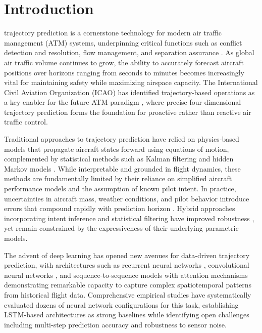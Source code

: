 \documentclass[letterpaper,journal]{IEEEtran}
\begin{document}
\section{Introduction}
 trajectory prediction is a cornerstone technology for
modern air traffic management (ATM) systems, underpinning critical functions such
as conflict detection and resolution, flow management, and separation assurance
\cite{ICAO2025,Schuster2024}. As global air traffic volume continues to grow,
the ability to accurately forecast aircraft positions over horizons ranging from
seconds to minutes becomes increasingly vital for maintaining safety while maximizing
airspace capacity. The International Civil Aviation Organization (ICAO) has identified
trajectory-based operations as a key enabler for the future ATM paradigm \cite{ICAO2025},
where precise four-dimensional trajectory prediction forms the foundation for proactive
rather than reactive air traffic control.

Traditional approaches to trajectory prediction have relied on physics-based models
that propagate aircraft states forward using equations of motion, complemented by
statistical methods such as Kalman filtering and hidden Markov models \cite{Lymperopoulos2010,
Alligier2015}. While interpretable and grounded in flight dynamics, these methods are
fundamentally limited by their reliance on simplified aircraft performance models and
the assumption of known pilot intent. In practice, uncertainties in aircraft mass,
weather conditions, and pilot behavior introduce errors that compound rapidly with
prediction horizon \cite{Zhang2021}. Hybrid approaches incorporating intent inference
and statistical filtering have improved robustness \cite{Liu2016}, yet remain constrained
by the expressiveness of their underlying parametric models.

The advent of deep learning has opened new avenues for data-driven trajectory prediction,
with architectures such as recurrent neural networks \cite{Pang2020}, convolutional neural
networks \cite{Chen2022TITS}, and sequence-to-sequence models with attention mechanisms
\cite{Zhang2020,Georgiou2022} demonstrating remarkable capacity to capture complex
spatiotemporal patterns from historical flight data. Comprehensive empirical studies
\cite{Ayala2023} have systematically evaluated dozens of neural network configurations
for this task, establishing LSTM-based architectures as strong baselines while identifying
open challenges including multi-step prediction accuracy and robustness to sensor noise.
\end{document}
